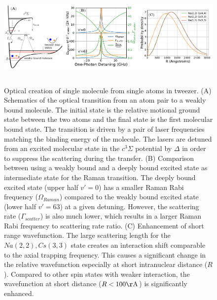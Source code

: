 \documentclass[aps,prl,twocolumn,superscriptaddress]{revtex4-1}
\begin{document}
\begin{figure}
  \includegraphics[height=5cm]{fig1.pdf}
  \caption{Optical creation of single molecule from single atoms in tweezer.
    (A) Schematics of the optical transition from an atom pair to a weakly bound molecule.
    The initial state is the relative motional ground state between the two atoms
    and the final state is the first molecular bound state.
    The transition is driven by a pair of laser frequencies matching the binding energy
    of the molecule.
    The lasers are detuned from an excited molecular state in the $c^3\Sigma$ potential
    by $\Delta$ in order to suppress the scattering during the transfer.
    (B) Comparison between using a weakly bound and a deeply bound excited state
    as intermediate state for the Raman transition.
    The deeply bound excited state (upper half $v'=0$) has a smaller Raman Rabi frequency ($\Omega_{Raman}$)
    compared to the weakly bound excited state (lower half $v'=63$) at a given detuning.
    However, the scattering rate ($\Gamma_{scatter}$) is also much lower,
    which results in a larger Raman Rabi frequency to scattering rate ratio.
    (C) Enhancement of short range wavefunction.
    The large scattering length for the $Na(2,2),Cs(3,3)$ state creates an interaction shift
    comparable to the axial trapping frequency.
    This causes a significant change in the relative wavefunction especially at short
    intranuclear distance ($R$).
    Compared to other spin states with weaker interaction,
    the wavefunction at short distance ($R<100\mathrm{\AA}$) is significantly enhanced.
    \label{f-theory}
  }
\end{figure}





\end{document}
